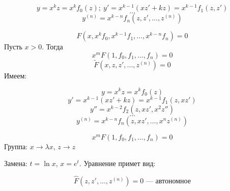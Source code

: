   \[ y  =x^kz = x^kf_0(z);~ y' = x^{k-1}(xz' + kz) = x^{k - 1}f_1(z, z') \]
  \[ \ldots \]
  \[ y^{(n)} = x^{k - n} f_n(z, z', \ldots, z^{(n)}) \]

  \[ F(x, x^kf_0, x^{k-1}f_1, \ldots, x^{k-n}f_n) = 0 \]
  Пусть $x > 0$. Тогда 
  \[ x^mF(1, f_0, f_1, \ldots, f_n) = 0 \]
  \[ \tilde{F}(x, z, z', \ldots, z^{(n)}) = 0 \]
  Имеем:

  \[ y = x^kz = x^kf_0(z) \]
  \[ y' = x^{k-1}(xz' + kz) = x^{k-1}f_1(z, xz') \]
  \[ y'' = x^{k-2}f_2(z, xz', x^2z'') \]
  \[ \ldots \]
  \[ y^{(n)} = x^{k-n}f_n(z, xz', \ldots, x^nz^{(n)}) \]

  \[ x^mF(1, f_0, f_1, \ldots, f_n) = 0\]
  Группа: $x \rightarrow \lambda x$, $z \rightarrow z$

  \noindent Замена: $t = \ln x$, $x = e^t$. Уравнение примет вид:

  \[ \hat{F}(z, z', \ldots, z^{(n)}) = 0 \text{ --- автономное}\]